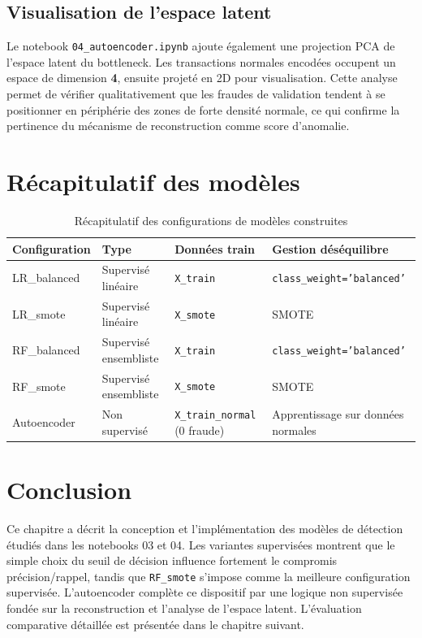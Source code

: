 \documentclass[12pt,a4paper,twoside]{report}
\begin{document}
\subsection{Visualisation de l'espace latent}

Le notebook \texttt{04\_autoencoder.ipynb} ajoute également une projection PCA de l'espace latent du bottleneck. Les transactions normales encodées occupent un espace de dimension \textbf{4}, ensuite projeté en 2D pour visualisation. Cette analyse permet de vérifier qualitativement que les fraudes de validation tendent à se positionner en périphérie des zones de forte densité normale, ce qui confirme la pertinence du mécanisme de reconstruction comme score d'anomalie.

\section{Récapitulatif des modèles}

\begin{table}[H]
\centering
\caption{Récapitulatif des configurations de modèles construites}
\label{tab:models_recap}
\begin{tabular}{llll}
\toprule
\textbf{Configuration} & \textbf{Type} & \textbf{Données train} & \textbf{Gestion déséquilibre} \\
\midrule
LR\_balanced & Supervisé linéaire & \texttt{X\_train} & \texttt{class\_weight='balanced'} \\
LR\_smote    & Supervisé linéaire & \texttt{X\_smote} & SMOTE \\
RF\_balanced & Supervisé ensembliste & \texttt{X\_train} & \texttt{class\_weight='balanced'} \\
RF\_smote    & Supervisé ensembliste & \texttt{X\_smote} & SMOTE \\
Autoencoder  & Non supervisé & \texttt{X\_train\_normal} (0 fraude) & Apprentissage sur données normales \\
\bottomrule
\end{tabular}
\end{table}

\section{Conclusion}

Ce chapitre a décrit la conception et l'implémentation des modèles de détection étudiés dans les notebooks 03 et 04. Les variantes supervisées montrent que le simple choix du seuil de décision influence fortement le compromis précision/rappel, tandis que \texttt{RF\_smote} s'impose comme la meilleure configuration supervisée. L'autoencoder complète ce dispositif par une logique non supervisée fondée sur la reconstruction et l'analyse de l'espace latent. L'évaluation comparative détaillée est présentée dans le chapitre suivant.
\end{document}
